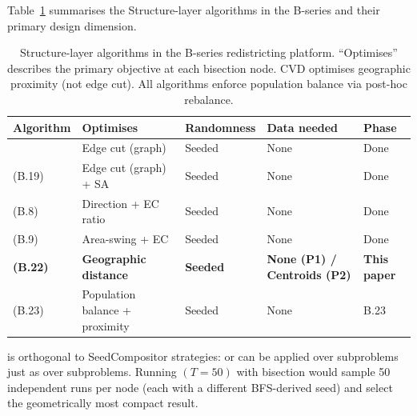 Table~\ref{tab:structure-comparison-bg} summarises the Structure-layer
algorithms in the B-series and their primary design dimension.

\begin{table}[t]
\centering
\caption{Structure-layer algorithms in the B-series redistricting platform.
  ``Optimises'' describes the primary objective at each bisection node.
  CVD optimises geographic proximity (not edge cut).
  All algorithms enforce population balance via post-hoc rebalance.}
\label{tab:structure-comparison-bg}
\renewcommand{\arraystretch}{1.25}
\begin{tabular}{@{}lllll@{}}
\toprule
Algorithm & Optimises & Randomness & Data needed & Phase \\
\midrule
\metis{}         & Edge cut (graph)       & Seeded  & None         & Done \\
\sa{} (B.19)     & Edge cut (graph) + SA  & Seeded  & None         & Done \\
\geosec{} (B.8)  & Direction + EC ratio   & Seeded  & None         & Done \\
\areasec{} (B.9) & Area-swing + EC        & Seeded  & None         & Done \\
\textbf{\cvd{} (B.22)} & \textbf{Geographic distance} & \textbf{Seeded}
                        & \textbf{None (P1) / Centroids (P2)} & \textbf{This paper} \\
\bfsgrowth{} (B.23) & Population balance + proximity & Seeded & None & B.23 \\
\bottomrule
\end{tabular}
\end{table}

\cvd{} is orthogonal to SeedCompositor strategies: \be{} or \cs{} can be
applied over \cvd{} subproblems just as over \metis{} subproblems.
Running \be{}$(T=50)$ with \cvd{} bisection would sample 50 independent
\cvd{} runs per node (each with a different BFS-derived seed) and select
the geometrically most compact result.
